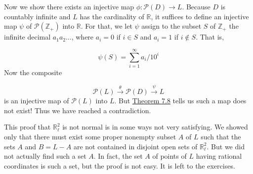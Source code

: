 \begin{centeredblock*}
\begin{example}
Now we show there exists an injective map \(\phi : \mathcal{P}( D) \rightarrow L\). Because \(D\) is countably infinite and \(L\) has the cardinality of \(\mathbb{R}\), it suffices to define an injective map \(\psi\) of \(\mathcal{P}( \mathbb{Z}_{ + })\) into \(\mathbb{R}\). For that, we let \(\psi\) assign to the subset \(S\) of \(\mathbb{Z}_{ + }\) the infinite decimal \(a_{1}a_{2}\ldots\), where \(a_{i} = 0\) if \(i \in S\) and \(a_{i} = 1\) if \(i \notin S\). That is,

\[
\psi ( S) = \mathop{\sum }\limits_{{i = 1}}^{\infty }a_{i}/{10}^{i}
\]
Now the composite

\[
\mathcal{P}( L) \overset{\theta }{ \rightarrow }\mathcal{P}( D) \overset{\psi }{ \rightarrow }L
\]
is an injective map of \(\mathcal{P}( L)\) into \(L\). But \hyperref[thm:7.8]{Theorem 7.8} tells us such a map does not exist! Thus we have reached a contradiction.

This proof that \(\mathbb{R}_{\ell }^{2}\) is not normal is in some ways not very satisfying. We showed only that there must exist some proper nonempty subset \(A\) of \(L\) such that the sets \(A\) and \(B = L - A\) are not contained in disjoint open sets of \(\mathbb{R}_{\ell }^{2}\). But we did not actually find such a set \(A\). In fact, the set \(A\) of points of \(L\) having rational coordinates is such a set, but the proof is not easy. It is left to the exercises.
\end{example}
\end{centeredblock*}

